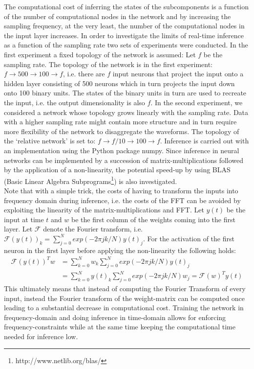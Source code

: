The computational cost of inferring the states of the subcomponents is a function of the number of computational nodes in the network and by increasing the sampling frequency, at the very least, the number of the computational nodes in the input layer increases. In order to investigate the limits of real-time inference as a function of the sampling rate two sets of experiments were conducted. In the first experiment a fixed topology of the network is assumed: Let $f$ be the sampling rate. The topology of the network is in the first experiment: $f \rightarrow 500 \rightarrow 100 \rightarrow f$, i.e. there are $f$ input neurons that project the input onto a hidden layer consisting of 500 neurons which in turn projects the input down onto 100 binary units. The states of the binary units in turn are used to recreate the input, i.e. the output dimensionality is also $f$. In the second experiment, we considered a network whose topology grows linearly with the sampling rate. Data with a higher sampling rate might contain more structure and in turn require more flexibility of the network to disaggregate the waveforms. The topology of the `relative network' is set to: $f \rightarrow f/10 \rightarrow 100 \rightarrow f$. Inference is carried out with an implementation using the Python package numpy. Since inference in neural networks can be implemented by a succession of matrix-multiplications followed by the application of a non-linearity, the potential speed-up by using BLAS (Basic Linear Algebra Subprograms\footnote{http://www.netlib.org/blas/}) is also investigated.\\
Note that with a simple trick, the costs of having to transform the inputs into frequency domain during inference, i.e. the costs of the FFT can be avoided by exploiting the linearity of the matrix-multiplications and FFT. Let $y(t)$ be the input at time $t$ and $w$ be the first column of the weights coming into the first layer. Let $\mathcal{F}$ denote the Fourier transform, i.e. $\mathcal{F}(y(t))_k = \sum_{j=0}^N exp(-2\pi jk/N)y(t)_j$. For the activation of the first neuron in the first layer before applying the non-linearity the following holds: 
\begin{align*}
\mathcal{F}(y(t))^Tw &=\sum_{k=0}^N w_k \sum_{j=0}^N exp(-2\pi jk/N)y(t)_j\\
 &=\sum_{k=0}^N y(t)_k \sum_{j=0}^N exp(-2\pi jk/N) w_j = \mathcal{F}(w)^Ty(t)
\end{align*}
 This ultimately means that instead of computing the Fourier Transform of every input, instead the Fourier transform of the weight-matrix can be computed once leading to a substantial decrease in computational cost. Training the network in frequency-domain and doing inference in time-domain allows for enforcing frequency-constraints while at the same time keeping the computational time needed for inference low.\\
